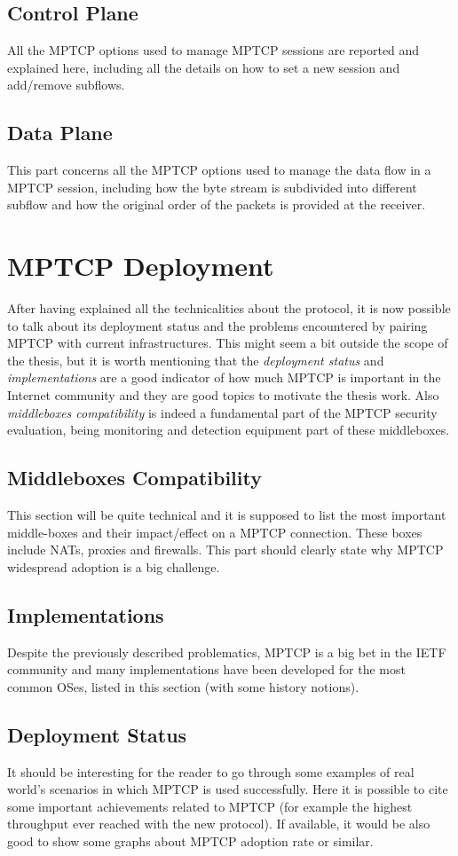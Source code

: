 \subsection{Control Plane}
All the MPTCP options used to manage MPTCP sessions are reported and explained here, including all the details on how to set a new session and add/remove subflows.

\subsection{Data Plane}
This part concerns all the MPTCP options used to manage the data flow in a MPTCP session, including how the byte stream is subdivided into different subflow and how the original order of the packets is provided at the receiver.

\section{MPTCP Deployment}
After having explained all the technicalities about the protocol, it is now possible to talk about its deployment status and the problems encountered by pairing MPTCP with current infrastructures. This might seem a bit outside the scope of the thesis, but it is worth mentioning that the \textit{deployment status} and \textit{implementations} are a good indicator of how much MPTCP is important in the Internet community and they are good topics to motivate the thesis work. Also \textit{middleboxes compatibility} is indeed a fundamental part of the MPTCP security evaluation, being monitoring and detection equipment part of these middleboxes.

\subsection{Middleboxes Compatibility}
This section will be quite technical and it is supposed to list the most important middle-boxes and their impact/effect on a MPTCP connection. These boxes include NATs, proxies and firewalls. This part should clearly state why MPTCP widespread adoption is a big challenge.

\subsection{Implementations}
Despite the previously described problematics, MPTCP is a big bet in the IETF community and many implementations have been developed for the most common OSes, listed in this section (with some history notions).

\subsection{Deployment Status}
It should be interesting for the reader to go through some examples of real world's scenarios in which MPTCP is used successfully. Here it is possible to cite some important achievements related to MPTCP (for example the highest throughput ever reached with the new protocol).
If available, it would be also good to show some graphs about MPTCP adoption rate or similar.